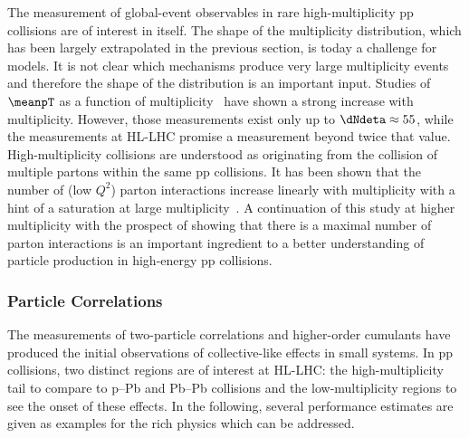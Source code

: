 \documentclass[../report.tex]{subfiles}
\begin{document}
The measurement of global-event observables in rare high-multiplicity pp collisions are of interest in itself. The shape of the multiplicity distribution, which has been largely extrapolated in the previous section, is today a challenge for models. It is not clear which mechanisms produce very large multiplicity events and therefore the shape of the distribution is an important input. Studies of $\meanpT$ as a function of multiplicity~\cite{Abelev:2013bla} have shown a strong increase with multiplicity. However, those measurements exist only up to $\dNdeta \approx 55$, while the measurements at HL-LHC promise a measurement beyond twice that value. High-multiplicity collisions are understood as originating from the collision of multiple partons within the same pp collisions. It has been shown that the number of (low $Q^2$) parton interactions increase linearly with multiplicity with a hint of a saturation at large multiplicity~\cite{Abelev:2013sqa}. A continuation of this study at higher multiplicity with the prospect of showing that there is a maximal number of parton interactions is an important ingredient to a better understanding of particle production in high-energy pp collisions.

\subsubsection{Particle Correlations}

The measurements of two-particle correlations and higher-order cumulants have produced the initial observations of collective-like effects in small systems. In pp collisions, two distinct regions are of interest at HL-LHC: the high-multiplicity tail to compare to p--Pb and Pb--Pb collisions and the low-multiplicity regions to see the onset of these effects. In the following, several performance estimates are given as examples for the rich physics which can be addressed. 
\end{document}
